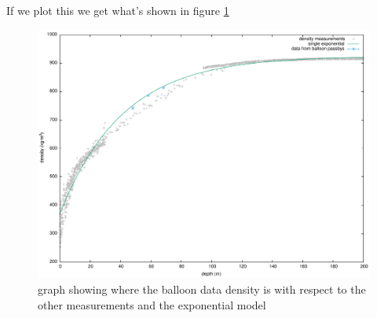 \documentclass[11pt,a4paper,faculty=we,language=en,doctype=report]{cls/ugent-doc}
\begin{document}
If we plot this we get what's shown in figure
\ref{fig:BalloonDensity6And7}
\begin{figure}
	\centering
	\includegraphics[width=\textwidth]{6And7DensityFromBalloon.pdf}
	\caption{graph showing where the balloon data density is with
	respect to the other measurements and the exponential model}
	\label{fig:BalloonDensity6And7}
\end{figure}
\end{document}
